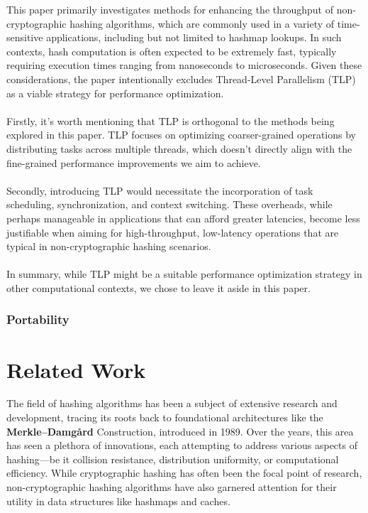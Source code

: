 \documentclass[10pt]{article}
\begin{document}
This paper primarily investigates methods for enhancing the throughput of non-cryptographic hashing algorithms, which are commonly used in a variety of time-sensitive applications, including but not limited to hashmap lookups.
In such contexts, hash computation is often expected to be extremely fast, typically requiring execution times ranging from nanoseconds to microseconds. Given these considerations, the paper intentionally excludes Thread-Level Parallelism
(TLP) as a viable strategy for performance optimization.\\\\
Firstly, it's worth mentioning that TLP is orthogonal to the methods being explored in this paper.
TLP focuses on optimizing coarser-grained operations by distributing tasks across multiple threads, which doesn't directly align with the fine-grained performance improvements we aim to achieve.\\\\
Secondly, introducing TLP would necessitate the incorporation of task scheduling, synchronization, and context switching.
These overheads, while perhaps manageable in applications that can afford greater latencies, become less justifiable when aiming for high-throughput, low-latency operations that are typical in non-cryptographic hashing scenarios.\\\\
In summary, while TLP might be a suitable performance optimization strategy in other computational contexts, we chose to leave it aside in this paper.

\subsubsection{Portability}

\clearpage
\section{Related Work}

The field of hashing algorithms has been a subject of extensive research and development, tracing its roots back to foundational architectures like the \textbf{Merkle–Damgård} Construction\cite{merkle}\cite{damgard}, introduced in 1989. Over the years, this area has seen a plethora of innovations, each attempting to address various aspects of hashing—be it collision resistance, distribution uniformity, or computational efficiency. While cryptographic hashing has often been the focal point of research, non-cryptographic hashing algorithms have also garnered attention for their utility in data structures like hashmaps and caches.
\end{document}

